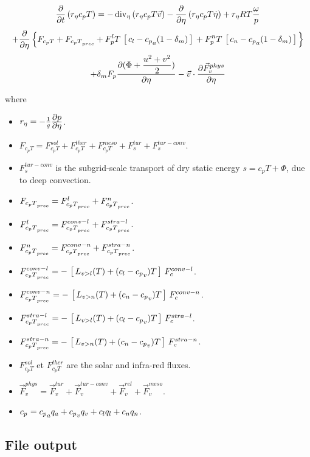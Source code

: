 \begin{displaymath}
  \DerP{}{t}\lp\re c_p T\rp=
  - \divi{\eta}\lp\re c_p T \vec{v}\rp
  - \DerP{}{\eta}\lp\re c_p T \dot{\eta}\rp
  + \re R T \frac{\omega}{p}
\end{displaymath}
\begin{displaymath}
  +\DerP{}{\eta}\lb F_{c_p T} + \fcptp{}
  + \fpl{} T \lc c_l - \cp{a} (1-\delta_m)\rc 
  + \fpn{} T \lc c_n - \cp{a} (1-\delta_m)\rc\rb
\end{displaymath}
\begin{equation}\label{Bilh}
  +\delta_m\fp{}\DerP{(\Phi+\ec)}{\eta}
  -\vec v\cdot\DerP{\vec F_v^{phys}}{\eta}
\end{equation}

\noi where

\begin{itemize}
        \item $\re=-\frac{1}{g}\DerP{p}{\eta}$.
        \item $F_{c_p T}=F_{c_p T}^{sol}+F_{c_p T}^{ther}+F_{c_p T}^{meso}+F_{s}^{tur}+F_{s}^{tur-conv}$.
        \item $F_{s}^{tur-conv}$ is the subgrid-scale transport of dry static energy $s=c_p T + \Phi$, due to deep convection.
        \item $\fcptp{}=\fcptpl{}+\fcptpn{}$.
        \item $\fcptpl{}=\fcptpcl{}+\fcptpsl{}$.
        \item $\fcptpn{}=\fcptpcn{}+\fcptpsn{}$.
        \item $\fcptpcl{}=-\lc\lvl+(c_l-\cp{v})T\rc \fccl{}$.
        \item $\fcptpcn{}=-\lc\lvn+(c_n-\cp{v})T\rc \fccn{}$.
        \item $\fcptpsl{}=-\lc\lvl+(c_l-\cp{v})T\rc \fcsl{}$.
        \item $\fcptpsn{}=-\lc\lvn+(c_n-\cp{v})T\rc \fcsn{}$.
        \item $F_{c_p T}^{sol}$ et $F_{c_p T}^{ther}$ are the solar and infra-red fluxes. 
        \item $\vec F_v^{phys}= \vec F_v^{tur}+\vec F_v^{tur-conv}+\vec F_v^{rel}+\vec F_v^{meso}$.
        \item $\cp{}= \cp{a} q_a +  \cp{v} q_v + c_l q_l + c_n q_n $.
\end{itemize}

\subsection*{File output}

